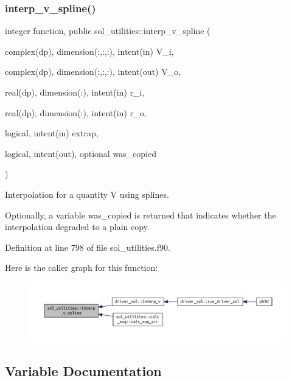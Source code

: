 \subsubsection{\texorpdfstring{interp\+\_\+v\+\_\+spline()}{interp\_v\_spline()}}
{\footnotesize\ttfamily integer function, public sol\+\_\+utilities\+::interp\+\_\+v\+\_\+spline (\begin{DoxyParamCaption}\item[{complex(dp), dimension(\+:,\+:,\+:), intent(in)}]{V\+\_\+i,  }\item[{complex(dp), dimension(\+:,\+:,\+:), intent(out)}]{V\+\_\+o,  }\item[{real(dp), dimension(\+:), intent(in)}]{r\+\_\+i,  }\item[{real(dp), dimension(\+:), intent(in)}]{r\+\_\+o,  }\item[{logical, intent(in)}]{extrap,  }\item[{logical, intent(out), optional}]{was\+\_\+copied }\end{DoxyParamCaption})}



Interpolation for a quantity V using splines. 

Optionally, a variable \textquotesingle{}was\+\_\+copied\textquotesingle{} is returned that indicates whether the interpolation degraded to a plain copy. 

Definition at line 798 of file sol\+\_\+utilities.\+f90.

Here is the caller graph for this function\+:\nopagebreak
\begin{figure}[H]
\begin{center}
\leavevmode
\includegraphics[width=350pt]{namespacesol__utilities_a93969085ad0fce8e530493a412b1ce38_icgraph}
\end{center}
\end{figure}


\subsection{Variable Documentation}
\mbox{\label{namespacesol__utilities_a4779ff845b4ddc046892bf4eb4490dd2}} 
